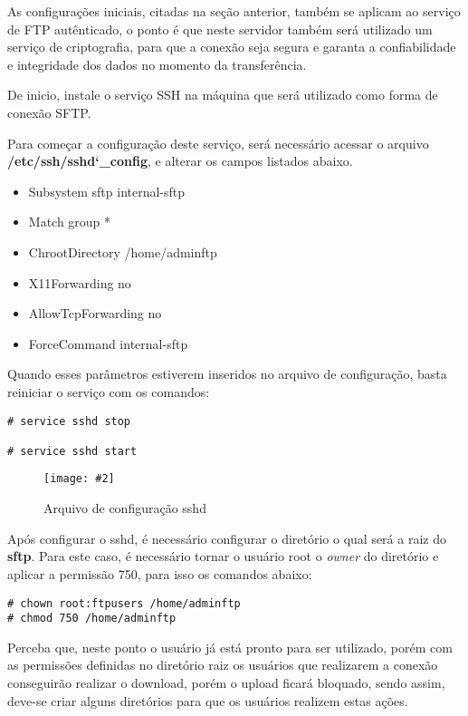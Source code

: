 \documentclass[
	12pt,				%
	openright,			%
	twoside,			%
	openany,			%
	a4paper,			%
	chapter=TITLE,		%
	section=TITLE,		%
	subsection=TITLE,	%
	subsubsection=TITLE,%
	english,
	brazil				%
]{abntex2}
\newcommand{\includeImage}[3] {

\begin{figure}[H]
 	 \centering
  		\texttt{[image: \#2]}
  	\caption{#3}
\end{figure}

}
\begin{document}
As configurações iniciais, citadas na seção anterior, também se aplicam ao serviço de FTP autênticado, o ponto é que neste servidor também será utilizado um serviço de criptografia, para que a conexão seja segura e garanta a confiabilidade e integridade dos dados no momento da transferência.

De inicio, instale o serviço SSH na máquina que será utilizado como forma de conexão SFTP.

Para começar a configuração deste serviço, será necessário acessar o arquivo \textbf{/etc/ssh/sshd\char`_config}, e alterar os campos listados abaixo.

\begin{itemize}
	\item Subsystem sftp internal-sftp
	\item Match group *
	\item ChrootDirectory /home/adminftp
	\item X11Forwarding no
	\item AllowTcpForwarding no
	\item ForceCommand internal-sftp
\end{itemize}

Quando esses parâmetros estiverem inseridos no arquivo de configuração, basta reiniciar o serviço com os comandos:

\begin{lstlisting}
# service sshd stop

# service sshd start
\end{lstlisting}

\includeImage{0.5}{../imgs/5_sftp/arquivo_de_configuracao_sshd.png}{Arquivo de configuração sshd}

Após configurar o sshd, é necessário configurar o diretório o qual será a raiz do \textbf{sftp}. Para este caso, é necessário tornar o usuário root o \textit{owner} do diretório e aplicar a permissão 750, para isso os comandos abaixo:

\begin{lstlisting}
# chown root:ftpusers /home/adminftp
# chmod 750 /home/adminftp
\end{lstlisting}

Perceba que, neste ponto o usuário já está pronto para ser utilizado, porém com as permissões definidas no diretório raiz os usuários que realizarem a conexão conseguirão realizar o download, porém o upload ficará bloquado, sendo assim, deve-se criar alguns diretórios para que os usuários realizem estas ações.
\end{document}
